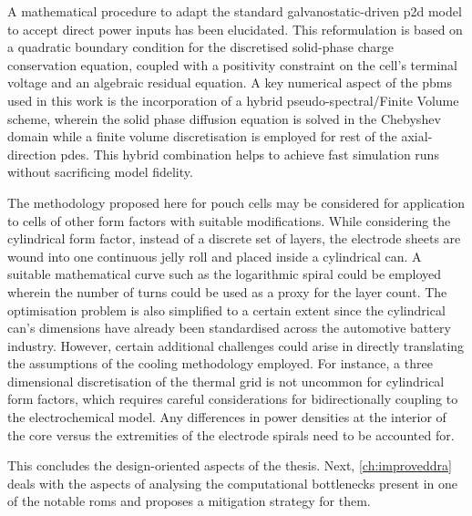 \addlines[0.5]
A mathematical procedure to adapt the standard galvanostatic-driven \gls{p2d}
model to accept direct power inputs has been elucidated. This reformulation is
based on a quadratic boundary condition for the discretised solid-phase charge
conservation equation, coupled with a positivity constraint on the cell's
terminal voltage and an algebraic residual equation. A key numerical aspect of
the \glspl{pbm} used in this work is the incorporation of a hybrid
pseudo-spectral/Finite Volume scheme, wherein the solid phase diffusion equation
is solved in the Chebyshev domain while a finite volume discretisation is
employed for rest of the axial-direction \glspl{pde}. This hybrid combination
helps to achieve fast simulation runs without sacrificing model fidelity.

The methodology proposed here for pouch cells may be considered for application
to cells of other form factors with suitable modifications. While considering
the cylindrical form factor, instead of a discrete set of layers, the electrode
sheets are wound into one continuous jelly roll and placed inside a cylindrical
can.  A suitable mathematical curve such as the logarithmic spiral could be
employed wherein the number of turns could be used as a proxy for the layer
count. The optimisation problem is also simplified to a certain extent since the
cylindrical can's dimensions have already been standardised across the
automotive battery industry. However, certain additional challenges could arise
in directly translating the assumptions of the cooling methodology employed. For
instance, a three dimensional discretisation of the thermal grid is not uncommon
for cylindrical form factors, which requires careful considerations for
bidirectionally coupling to the electrochemical model. Any differences in power
densities at the interior of the core versus the extremities of the electrode
spirals need to be accounted for.

This concludes the design-oriented aspects of the thesis. Next,
\cref{ch:improveddra} deals with the aspects of analysing the computational
bottlenecks present in one of the notable \glspl{rom} and proposes a mitigation
strategy for them.





